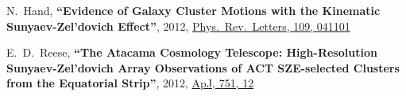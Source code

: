 \documentclass{article}
\def\myself{\textbf{\color{red} C.~Sif\'on}}
\def\prl{Phys.\ Rev.\ Letters}
\newcommand{\paper}[1]{\textbf{``#1''}}
\begin{document}
\begin{etaremune}
\item
N.~Hand, 
\paper{Evidence of Galaxy Cluster Motions with the Kinematic Sunyaev-Zel'dovich Effect}, 
2012, \href{http://adsabs.harvard.edu/adsabs/abs/2012PhRvL.109d1101H}{\prl, 109, 041101}

\item
E.~D.~Reese, 
\paper{The Atacama Cosmology Telescope: High-Resolution Sunyaev-Zel'dovich Array Observations of ACT
SZE-selected Clusters from the Equatorial Strip}, 
2012, \href{http://adsabs.harvard.edu/adsabs/abs/2012ApJ...751...12R}{ApJ, 751, 12}


\end{etaremune}
\end{document}
